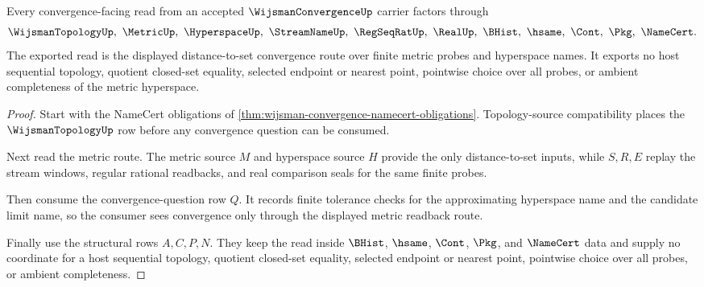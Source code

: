 \begin{theorem}
\label{thm:wijsman-convergence-metric-readback-route}
Every convergence-facing read from an accepted $\WijsmanConvergenceUp$ carrier factors through
$$
\WijsmanTopologyUp,\ \MetricUp,\ \HyperspaceUp,\ \StreamNameUp,\ \RegSeqRatUp,\ \RealUp,\ \BHist,\ \hsame,\ \Cont,\ \Pkg,\ \NameCert.
$$
The exported read is the displayed distance-to-set convergence route over finite metric probes and hyperspace names. It exports no host sequential topology, quotient closed-set equality, selected endpoint or nearest point, pointwise choice over all probes, or ambient completeness of the metric hyperspace.
\end{theorem}
\begin{proof}
Start with the NameCert obligations of \autoref{thm:wijsman-convergence-namecert-obligations}. Topology-source compatibility places the $\WijsmanTopologyUp$ row before any convergence question can be consumed.

Next read the metric route. The metric source $M$ and hyperspace source $H$ provide the only distance-to-set inputs, while $S,R,E$ replay the stream windows, regular rational readbacks, and real comparison seals for the same finite probes.

Then consume the convergence-question row $Q$. It records finite tolerance checks for the approximating hyperspace name and the candidate limit name, so the consumer sees convergence only through the displayed metric readback route.

Finally use the structural rows $A,C,P,N$. They keep the read inside $\BHist$, $\hsame$, $\Cont$, $\Pkg$, and $\NameCert$ data and supply no coordinate for a host sequential topology, quotient closed-set equality, selected endpoint or nearest point, pointwise choice over all probes, or ambient completeness.
\end{proof}



